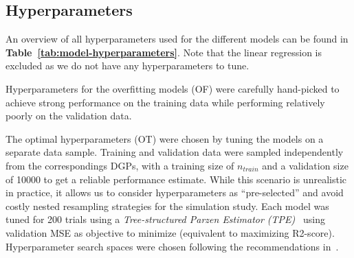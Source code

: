 \documentclass[runningheads]{llncs}
\begin{document}
\subsection{Hyperparameters}

An overview of all hyperparameters used for the different models can be found
in \textbf{Table~\ref{tab:model-hyperparameters}}. Note that the linear
regression is excluded as we do not have any hyperparameters to tune.

Hyperparameters for the overfitting models (OF) were carefully hand-picked to
achieve strong performance on the training data while performing relatively
poorly on the validation data.

The optimal hyperparameters (OT) were chosen by tuning the models on a separate
data sample. Training and validation data were sampled independently from the
correspondings DGPs, with a training size of $n_{train}$ and a validation size
of 10000 to get a reliable performance estimate. While this scenario is
unrealistic in practice, it allows us to consider hyperparameters as
``pre-selected'' and avoid costly nested resampling strategies for the
simulation study. Each model was tuned for 200 trials using a
\textit{Tree-structured Parzen Estimator (TPE)}~\cite{bergstra2011algorithms}
using validation MSE as objective to minimize (equivalent to maximizing
R2-score). Hyperparameter search spaces were chosen following the
recommendations in~\cite{probst_tunability_2019}.
\end{document}
